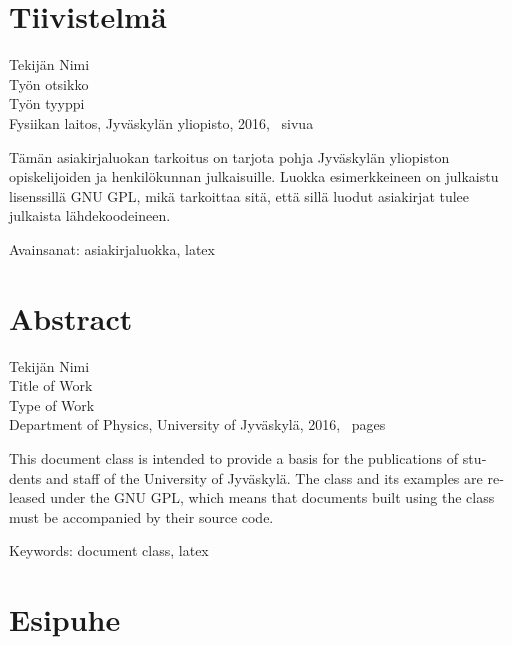 \documentclass[final, finnished, monochromatic]{jyu}
\newcommand \jyuauthor{Tekijän Nimi}
\newcommand \jyuauthorfinnish \jyuauthor
\newcommand \jyutitle{Title of Work}
\newcommand \jyutitlefinnish{Työn otsikko}
\newcommand \jyupublication{Type of Work}
\newcommand \jyupublicationfinnish{Työn tyyppi}
\newcommand \jyuuniversity{University of Jyväskylä}
\newcommand \jyuuniversityfinnish{Jyväskylän yliopisto}
\newcommand \jyudepartment{Department of Physics}
\newcommand \jyudepartmentfinnish{Fysiikan laitos}
\newcommand \jyuyear{2016}
\begin{document}
\maketitle

\section*{Tiivistelmä}

\noindent
\jyuauthorfinnish \\
\jyutitlefinnish \\
\jyupublicationfinnish \\
\jyudepartmentfinnish, \jyuuniversityfinnish, \jyuyear,
\pageref{p/lastpage}~sivua

\bigskip

\noindent
Tämän asiakirjaluokan tarkoitus on tarjota pohja
Jyväskylän yliopiston opiskelijoiden ja henkilökunnan julkaisuille.
Luokka esimerkkeineen on julkaistu lisenssillä GNU GPL, mikä tarkoittaa sitä,
että sillä luodut asiakirjat tulee julkaista lähdekoodeineen.

\bigskip

\noindent Avainsanat: asiakirjaluokka, latex

\section*{Abstract}

\noindent
\jyuauthor \\
\jyutitle \\
\jyupublication \\
\jyudepartment, \jyuuniversity, \jyuyear,
\pageref{p/lastpage}~pages

\bigskip

\begin{otherlanguage}{english}
  \noindent
  This document class is intended to provide a basis
  for the publications of students and staff of the University of Jyväskylä.
  The class and its examples are released under the GNU GPL, which means that
  documents built using the class must be accompanied by their source code.
\end{otherlanguage}

\bigskip

\noindent Keywords: document class, latex

\section*{Esipuhe}
\end{document}
